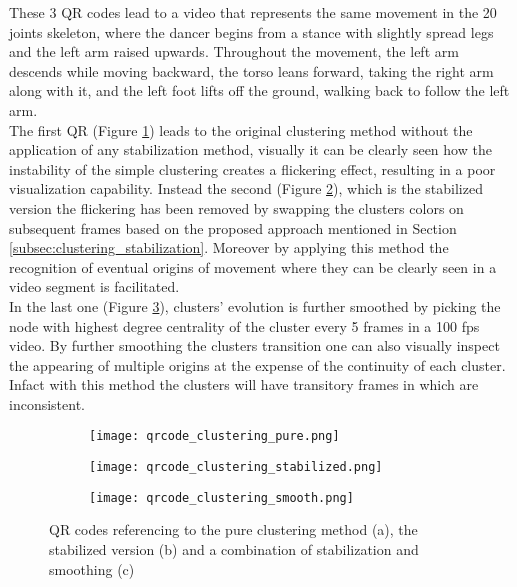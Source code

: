 These 3 QR codes lead to a video that represents the same movement in the 20 joints skeleton, where the dancer begins from a stance with slightly spread legs and the left arm raised upwards.
Throughout the movement, the left arm descends while moving backward, the torso leans forward, taking the right arm along with it, and the left foot lifts off the ground, walking back to follow the left arm.\\

The first QR (Figure \ref{fig:qr_movement_pure}) leads to the original clustering method without the application of any stabilization method, visually it can be clearly seen how the instability of the simple clustering creates a flickering effect, resulting in a poor visualization capability.
Instead the second (Figure \ref{fig:qr_movement_stabilized}), which is the stabilized version the flickering has been removed by swapping the clusters colors on subsequent frames based on the proposed approach mentioned in Section \ref{subsec:clustering_stabilization}.
Moreover by applying this method the recognition of eventual origins of movement where they can be clearly seen in a video segment is facilitated. \\

In the last one (Figure \ref{fig:qr_movement_smooth}), clusters' evolution is further smoothed by picking the node with highest degree centrality of the cluster every 5 frames in a 100 fps video.
By further smoothing the clusters transition one can also visually inspect the appearing of multiple origins at the expense of the continuity of each cluster. 
Infact with this method the clusters will have transitory frames in which are inconsistent.

\begin{figure}[H]
  \centering
  \begin{subfigure}[b]{0.49\textwidth}
    \centering
    \texttt{[image: qrcode\_clustering\_pure.png]}
    \caption{}
    \label{fig:qr_movement_pure}
  \end{subfigure}
  \hfill
  \begin{subfigure}[b]{0.49\textwidth}
    \centering
    \texttt{[image: qrcode\_clustering\_stabilized.png]}
    \caption{}
    \label{fig:qr_movement_stabilized}
  \end{subfigure}
  \hfill
  \begin{subfigure}[b]{0.49\textwidth}
    \centering
    \texttt{[image: qrcode\_clustering\_smooth.png]}
    \caption{}
    \label{fig:qr_movement_smooth}
  \end{subfigure}
  \caption{QR codes referencing to the pure clustering method (a), the stabilized version (b) and a combination of stabilization and smoothing (c)}
  \label{fig:qr_movements}
\end{figure}


